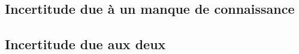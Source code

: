 \documentclass{beamer}
\begin{document}
\subsection{Incertitude due à un manque de connaissance}%

\subsection{Incertitude due aux deux}






\end{document}
